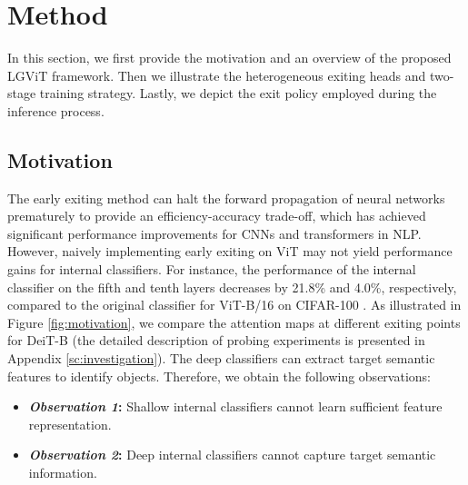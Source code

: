 
\section{Method}
\label{sc:method}

In this section, we first provide the motivation and an overview of the proposed LGViT framework. 
Then we illustrate the heterogeneous exiting heads and two-stage training strategy. 
Lastly, we depict the exit policy employed during the inference process. 


\subsection{Motivation}
The early exiting method can halt the forward propagation of neural networks prematurely to provide an efficiency-accuracy trade-off, 
which has achieved significant performance improvements for CNNs and transformers in NLP. 
However, naively implementing early exiting on ViT may not yield performance gains for internal classifiers. 
For instance, the performance of the internal classifier on the fifth and tenth layers decreases by 21.8\% and 4.0\%, respectively, 
compared to the original classifier for ViT-B/16 \cite{vit} on CIFAR-100 \cite{cifar}. 
As illustrated in Figure \ref{fig:motivation}, we compare the attention maps at different exiting points for DeiT-B 
(the detailed description of probing experiments is presented in Appendix \ref{sc:investigation}). 
The deep classifiers can extract target semantic features to identify objects. Therefore, 
we obtain the following observations: 
\begin{itemize}
  \item \textbf{\textit{Observation 1}:} Shallow internal classifiers cannot learn sufficient feature representation. 
  \item \textbf{\textit{Observation 2}:} Deep internal classifiers cannot capture target semantic information. 
\end{itemize}


